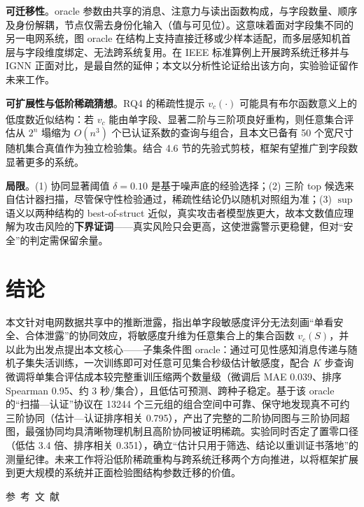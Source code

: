 \documentclass[10.5pt,compsoc,UTF8]{CjC}
\theoremstyle{mystyle}
\newcommand{\upcite}[1]{\textsuperscript{\cite{#1}}}
\begin{document}
\textbf{可迁移性}。oracle 参数由共享的消息、注意力与读出函数构成，与字段数量、顺序及身份解耦，节点仅需去身份化输入（值与可见位）。这意味着面对字段集不同的另一电网系统，图 oracle 在结构上支持直接迁移或少样本适配，而多层感知机首层与字段维度绑定、无法跨系统复用。在 IEEE 标准算例上开展跨系统迁移并与 IGNN 正面对比，是最自然的延伸；本文以分析性论证给出该方向，实验验证留作未来工作。

\textbf{可扩展性与低阶稀疏猜想}。RQ4 的稀疏性提示 $v_c(\cdot)$ 可能具有布尔函数意义上的低度数近似结构\upcite{odonnell2014boolean}：若 $v_c$ 能由单字段、显著二阶与三阶项良好重构，则任意集合评估从 $2^n$ 塌缩为 $O(n^3)$ 个已认证系数的查询与组合，且本文已备有 50 个宽尺寸随机集合真值作为独立检验集。结合 4.6 节的先验式剪枝，框架有望推广到字段数显著更多的系统。

\textbf{局限}。(1) 协同显著阈值 $\delta=0.10$ 是基于噪声底的经验选择；(2) 三阶 top 候选来自估计器扫描，尽管保守性检验通过，稀疏性结论仍以随机对照组为准；(3) $\sup$ 语义以两种结构的 best-of-struct 近似，真实攻击者模型族更大，故本文数值应理解为攻击风险的\textbf{下界证词}——真实风险只会更高，这使泄露警示更稳健，但对“安全”的判定需保留余量。

\section{\heiti 结论}

本文针对电网数据共享中的推断泄露，指出单字段敏感度评分无法刻画“单看安全、合体泄露”的协同效应，将敏感度升维为任意集合上的集合函数 $v_c(S)$，并以此为出发点提出本文核心——子集条件图 oracle：通过可见性感知消息传递与随机子集失活训练，一次训练即可对任意可见集合秒级估计敏感度，配合 $K$ 步查询微调将单集合评估成本较完整重训压缩两个数量级（微调后 MAE 0.039、排序 Spearman 0.95、约 3 秒/集合），且低估可预测、跨种子稳定。基于该 oracle 的“扫描—认证”协议在 13244 个三元组的组合空间中可靠、保守地发现真不可约三阶协同（估计—认证排序相关 0.795），产出了完整的二阶协同图与三阶协同超图，最强协同均具清晰物理机制且高阶协同被证明稀疏。实验同时否定了置零口径（低估 3.4 倍、排序相关 0.351），确立“估计只用于筛选、结论以重训证书落地”的测量纪律。未来工作将沿低阶稀疏重构与跨系统迁移两个方向推进，以将框架扩展到更大规模的系统并正面检验图结构参数迁移的价值。

\vspace {10mm}
\centerline
{\textsf{参~考~文~献}}
 \addtolength{\itemsep}{-1em}
\vspace {1.5mm}


\end{document}
